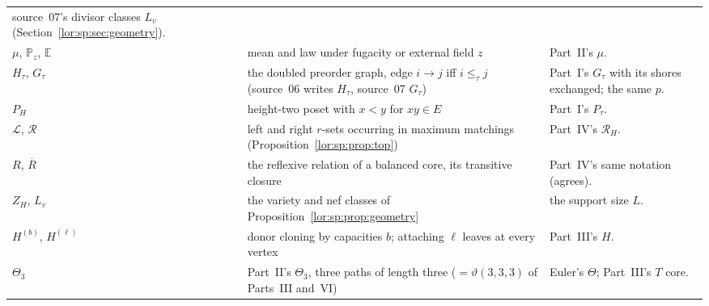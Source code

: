 \documentclass[11pt]{article}
\numberwithin{equation}{section}
\theoremstyle{definition}
\newcommand{\EE}{\mathbb E}
\newcommand{\PP}{\mathbb P}
\begin{document}
\begin{table}[tbp]
\begin{tabularx}{\textwidth}{@{}>{\raggedright}p{}>{\raggedright}p{}Y@{}}
 source~07's divisor classes $L_v$ (Section~\ref{lor:sp:sec:geometry}).\\
$\mu$, $\PP_z$, $\EE$ & mean and law under fugacity or external field $z$ &
 Part~II's $\mu$.\\
$H_\tau$, $G_\tau$ & the doubled preorder graph, edge $i\to j$ iff
 $i\le_\tau j$ (source~06 writes $H_\tau$, source~07 $G_\tau$) & Part~I's
 $G_\tau$ with its shores exchanged; the same $p$.\\
$P_H$ & height-two poset with $x<y$ for $xy\in E$ & Part~I's $P_\tau$.\\
$\mathcal L$, $\mathcal R$ & left and right $r$-sets occurring in maximum
 matchings (Proposition~\ref{lor:sp:prop:top}) & Part~IV's $\mathcal R_H$.\\
$R$, $\overline R$ & the reflexive relation of a balanced core, its transitive
 closure & Part~IV's same notation (agrees).\\
$Z_H$, $L_v$ & the variety and nef classes of
 Proposition~\ref{lor:sp:prop:geometry} & the support size $L$.\\
$H^{(b)}$, $H^{(\ell)}$ & donor cloning by capacities $b$; attaching $\ell$
 leaves at every vertex & Part~III's $H$.\\
$\Theta_3$ & Part~II's $\Theta_3$, three paths of length three
 ($=\vartheta(3,3,3)$ of Parts~III and~VI) & Euler's $\Theta$; Part~III's $T$ core.\\
\bottomrule
\end{tabularx}
\end{table}
\end{document}
